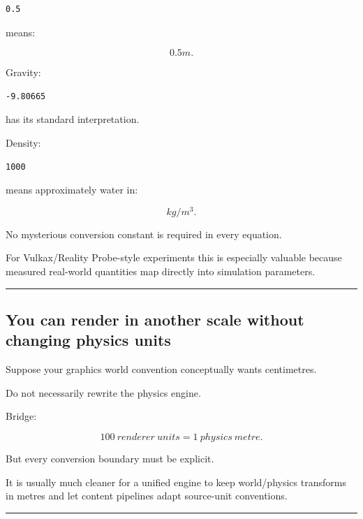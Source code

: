 \begin{verbatim}
0.5
\end{verbatim}

means:

\[
0.5m.
\]

Gravity:

\begin{verbatim}
-9.80665
\end{verbatim}

has its standard interpretation.

Density:

\begin{verbatim}
1000
\end{verbatim}

means approximately water in:

\[
kg/m^3.
\]

No mysterious conversion constant is required in every equation.

For Vulkax/Reality Probe-style experiments this is especially valuable because measured real-world quantities map directly into simulation parameters.

\begin{center}\rule{0.5\linewidth}{0.5pt}\end{center}

\subsection{You can render in another scale without changing physics units}\label{06-engine-ii-ch039-you-can-render-in-another-scale-without-changing-physics-units}

\hypertarget{06-engine-ii-ch039-you-can-render-in-another-scale-without-changing-physics-units}{}

Suppose your graphics world convention conceptually wants centimetres.

Do not necessarily rewrite the physics engine.

Bridge:

\[
100\ renderer\ units
=
1\ physics\ metre.
\]

But every conversion boundary must be explicit.

It is usually much cleaner for a unified engine to keep world/physics transforms in metres and let content pipelines adapt source-unit conventions.

\begin{center}\rule{0.5\linewidth}{0.5pt}\end{center}

